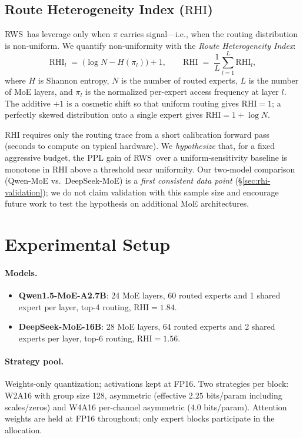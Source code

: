 \documentclass{article}
\newcommand{\method}{\textsc{RWS}\xspace}
\newcommand{\rhi}{\mathrm{RHI}}
\begin{document}
\subsection{Route Heterogeneity Index ($\rhi$)}
\label{sec:rhi}

\method\ has leverage only when $\pi$ carries signal---i.e., when the routing distribution is non-uniform. We quantify non-uniformity with the \emph{Route Heterogeneity Index}:
\begin{equation}
\label{eq:rhi}
\rhi_l \;=\; \big(\log N - H(\pi_l)\big) + 1, \qquad \rhi \;=\; \frac{1}{L}\sum_{l=1}^{L} \rhi_l,
\end{equation}
where $H$ is Shannon entropy, $N$ is the number of routed experts, $L$ is the number of MoE layers, and $\pi_l$ is the normalized per-expert access frequency at layer $l$. The additive $+1$ is a cosmetic shift so that uniform routing gives $\rhi = 1$; a perfectly skewed distribution onto a single expert gives $\rhi = 1 + \log N$.

$\rhi$ requires only the routing trace from a short calibration forward pass (seconds to compute on typical hardware). We \emph{hypothesize} that, for a fixed aggressive budget, the PPL gain of \method\ over a uniform-sensitivity baseline is monotone in $\rhi$ above a threshold near uniformity. Our two-model comparison (Qwen-MoE vs.\ DeepSeek-MoE) is a \emph{first consistent data point} (\S\ref{sec:rhi-validation}); we do not claim validation with this sample size and encourage future work to test the hypothesis on additional MoE architectures.

\section{Experimental Setup}
\label{sec:setup}

\paragraph{Models.}
\begin{itemize}
\item \textbf{Qwen1.5-MoE-A2.7B}: 24 MoE layers, 60 routed experts and 1 shared expert per layer, top-4 routing, $\rhi = 1.84$.
\item \textbf{DeepSeek-MoE-16B}: 28 MoE layers, 64 routed experts and 2 shared experts per layer, top-6 routing, $\rhi = 1.56$.
\end{itemize}

\paragraph{Strategy pool.} Weights-only quantization; activations kept at FP16. Two strategies per block: W2A16 with group size 128, asymmetric (effective $2.25$ bits/param including scales/zeros) and W4A16 per-channel asymmetric ($4.0$ bits/param). Attention weights are held at FP16 throughout; only expert blocks participate in the allocation.
\end{document}
